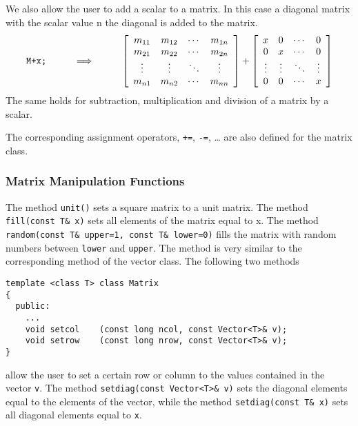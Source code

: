 We also allow the user to add a scalar to a matrix. In this case a diagonal
matrix with the scalar value n the diagonal is added to the matrix. 
\begin{eqnarray}
\verb&M+x;& \hspace{10mm} \Longrightarrow \hspace{10mm}
\left[ \begin{array}{cccc}
  m_{11} & m_{12} & \cdots & m_{1n} \\
  m_{21} & m_{22} & \cdots & m_{2n} \\
  \vdots & \vdots & \ddots & \vdots \\
  m_{n1} & m_{n2} & \cdots & m_{nn} \\
\end{array} \right] +
\left[ \begin{array}{cccc}
  x & 0 & \cdots & 0 \\
  0 & x & \cdots & 0 \\
  \vdots & \vdots & \ddots & \vdots \\
  0 & 0 & \cdots & x \\
\end{array} \right]  
\end{eqnarray}
The same holds for subtraction, multiplication and division of a matrix by a scalar.

The corresponding assignment operators, \verb&+=&, \verb&-=&, \dots
are also defined for the matrix class.


\subsubsection{Matrix Manipulation Functions}

The method \verb+unit()+ sets a square matrix to a unit matrix.
The method \verb+fill(const T& x)+ sets all elements of the matrix
equal to x. The method \verb+random(const T& upper=1, const T& lower=0)+
fills the matrix with random numbers between \verb+lower+ and \verb+upper+.
The method is very similar to the corresponding method of the vector class.
The following two methods 
{\footnotesize \begin{verbatim}
template <class T> class Matrix
{
  public:
    ...
    void setcol    (const long ncol, const Vector<T>& v);
    void setrow    (const long nrow, const Vector<T>& v);
}
\end{verbatim}}
allow the user to set a certain row or column to the values contained
in the vector \verb+v+. The method \verb+setdiag(const Vector<T>& v)+
sets the diagonal elements equal to the elements of the vector, while
the method \verb+setdiag(const T& x)+ sets all diagonal elements equal 
to \verb+x+.

